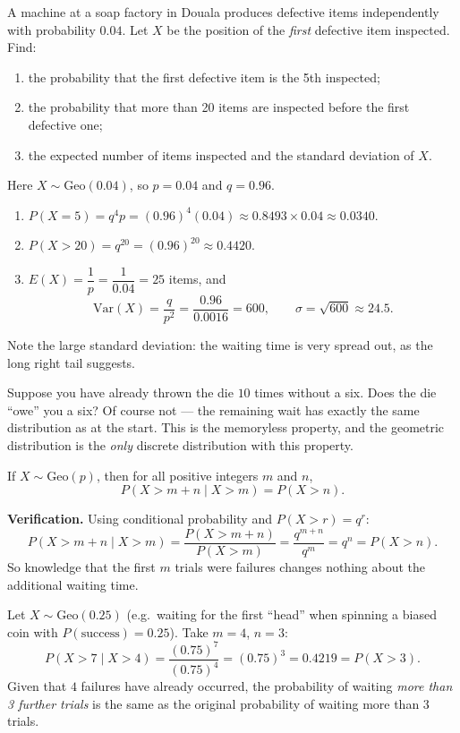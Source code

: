 \documentclass[11pt]{article}
\newcommand{\cle}[1]{{\popxbold\color{popdark}#1}}
\newcounter{popsec}
\newcounter{popsub}
\newcommand{\courssub}[1]{%
  \stepcounter{popsub}%
  \par\vspace{9pt}\noindent{\popxbold\fontsize{11.5}{13}\selectfont\color{popink}{\color{poporange}\thepopsec.\thepopsub}\hspace{6pt}#1}\par\nopagebreak\vspace{4pt}
}
\begin{document}
\begin{exoresolu}
A machine at a soap factory in Douala produces defective items independently with probability $0.04$. Let $X$ be the position of the \emph{first} defective item inspected. Find:
\begin{enumerate}
\item the probability that the first defective item is the 5th inspected;
\item the probability that more than 20 items are inspected before the first defective one;
\item the expected number of items inspected and the standard deviation of $X$.
\end{enumerate}
\tcblower
Here $X\sim\mathrm{Geo}(0.04)$, so $p=0.04$ and $q=0.96$.
\begin{enumerate}
\item $P(X=5)=q^{4}p=(0.96)^{4}(0.04)\approx 0.8493\times 0.04\approx 0.0340$.
\item $P(X>20)=q^{20}=(0.96)^{20}\approx 0.4420$.
\item $E(X)=\dfrac{1}{p}=\dfrac{1}{0.04}=25$ items, and
\[ \mathrm{Var}(X)=\frac{q}{p^{2}}=\frac{0.96}{0.0016}=600, \qquad \sigma=\sqrt{600}\approx 24.5. \]
\end{enumerate}
Note the large standard deviation: the waiting time is very spread out, as the long right tail suggests.
\end{exoresolu}

\courssub{The Memoryless Property}

Suppose you have already thrown the die $10$ times without a six. Does the die ``owe'' you a six? Of course not --- the remaining wait has exactly the same distribution as at the start. This is the \cle{memoryless property}, and the geometric distribution is the \emph{only} discrete distribution with this property.

\begin{propriete}
If $X\sim\mathrm{Geo}(p)$, then for all positive integers $m$ and $n$,
\[ \boxed{P(X>m+n \mid X>m)=P(X>n)}. \]
\end{propriete}

\textbf{Verification.} Using conditional probability and $P(X>r)=q^r$:
\[ P(X>m+n\mid X>m)=\frac{P(X>m+n)}{P(X>m)}=\frac{q^{m+n}}{q^{m}}=q^{n}=P(X>n). \]
So knowledge that the first $m$ trials were failures changes nothing about the additional waiting time.

\begin{exemplebox}
Let $X\sim\mathrm{Geo}(0.25)$ (e.g.\ waiting for the first ``head'' when spinning a biased coin with $P(\text{success})=0.25$). Take $m=4$, $n=3$:
\[ P(X>7\mid X>4)=\frac{(0.75)^{7}}{(0.75)^{4}}=(0.75)^{3}=0.4219=P(X>3). \]
Given that $4$ failures have already occurred, the probability of waiting \emph{more than 3 further trials} is the same as the original probability of waiting more than $3$ trials.
\end{exemplebox}
\end{document}
